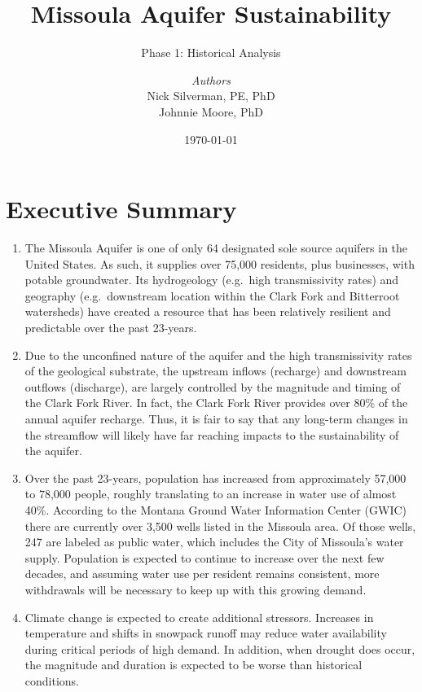 \documentclass[a4paper, 12pt]{report}
\institute{Adaptive Hydrology}
\title{Missoula Aquifer Sustainability}
\subtitle{Phase 1: Historical Analysis}
\author{\textit{Authors}\\Nick Silverman, PE, PhD\\Johnnie Moore, PhD}
\date{\today}
\providecommand{\tightlist}{%
  \setlength{\itemsep}{0pt}\setlength{\parskip}{0pt}}
\begin{document}
\maketitle

\section*{Executive Summary}
\begin{enumerate}
\tightlist
\item
  The Missoula Aquifer is one of only 64 designated sole source aquifers
  in the United States. As such, it supplies over 75,000 residents, plus
  businesses, with potable groundwater. Its hydrogeology (e.g.~high
  transmissivity rates) and geography (e.g.~downstream location within
  the Clark Fork and Bitterroot watersheds) have created a resource that
  has been relatively resilient and predictable over the past
  23-years.\\
\item
  Due to the unconfined nature of the aquifer and the high
  transmissivity rates of the geological substrate, the upstream inflows
  (recharge) and downstream outflows (discharge), are largely controlled
  by the magnitude and timing of the Clark Fork River. In fact, the
  Clark Fork River provides over 80\% of the annual aquifer recharge.
  Thus, it is fair to say that any long-term changes in the streamflow
  will likely have far reaching impacts to the sustainability of the
  aquifer.\\
\item
  Over the past 23-years, population has increased from approximately
  57,000 to 78,000 people, roughly translating to an increase in water
  use of almost 40\%. According to the Montana Ground Water Information
  Center (GWIC) there are currently over 3,500 wells listed in the
  Missoula area. Of those wells, 247 are labeled as public water, which
  includes the City of Missoula's water supply. Population is expected
  to continue to increase over the next few decades, and assuming water
  use per resident remains consistent, more withdrawals will be
  necessary to keep up with this growing demand.\\
\item
  Climate change is expected to create additional stressors. Increases
  in temperature and shifts in snowpack runoff may reduce water
  availability during critical periods of high demand. In addition, when
  drought does occur, the magnitude and duration is expected to be worse
  than historical conditions.\\

\end{enumerate}
\end{document}
